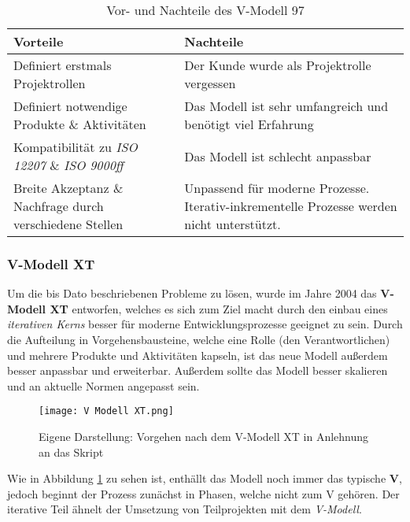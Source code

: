 \begin{table}[H]
    \centering
    \begin{tabulary}{0.9\textwidth}{|p{0.45\textwidth}|p{0.45\textwidth}|}
    \hline 
     Vorteile & Nachteile \\ 
    \hline 
    Definiert erstmals Projektrollen & Der Kunde wurde als Projektrolle vergessen \\
    \hline
    Definiert notwendige Produkte \& Aktivitäten & Das Modell ist sehr umfangreich und benötigt viel Erfahrung \\
    \hline
    Kompatibilität zu \textit{ISO 12207} \& \textit{ISO 9000ff} & Das Modell ist schlecht anpassbar \\
    \hline 
    Breite Akzeptanz \& Nachfrage durch verschiedene Stellen & Unpassend für moderne Prozesse. Iterativ-inkrementelle Prozesse werden nicht unterstützt. \\
    \hline
    \end{tabulary} 
    \caption[Vor- und Nachteile des V-Modell 97]{Vor- und Nachteile des V-Modell 97}
    \label{tabelle_VModell97VorNachteile}
\end{table}

\subsubsection{V-Modell XT}
Um die bis Dato beschriebenen Probleme zu lösen, wurde im Jahre 2004 das \textbf{V-Modell XT} entworfen, welches es sich zum Ziel macht durch den einbau eines \textit{iterativen Kerns} besser für moderne Entwicklungsprozesse geeignet zu sein. Durch die Aufteilung in Vorgehensbausteine, welche eine Rolle (den Verantwortlichen) und mehrere Produkte und Aktivitäten kapseln, ist das neue Modell außerdem besser anpassbar und erweiterbar. Außerdem sollte das Modell besser skalieren und an aktuelle Normen angepasst sein.

\begin{figure}[H]
    \centering
    \texttt{[image: V Modell XT.png]}
    \caption[Vorgehen nach dem V-Modell XT]{Eigene Darstellung: Vorgehen nach dem V-Modell XT in Anlehnung an das Skript}
    \label{abbildung_VModellXT}
\end{figure}

Wie in Abbildung \ref{abbildung_VModellXT} zu sehen ist, enthällt das Modell noch immer das typische \textbf{V}, jedoch beginnt der Prozess zunächst in Phasen, welche nicht zum V gehören. Der iterative Teil ähnelt der Umsetzung von Teilprojekten mit dem \textit{V-Modell}. 

